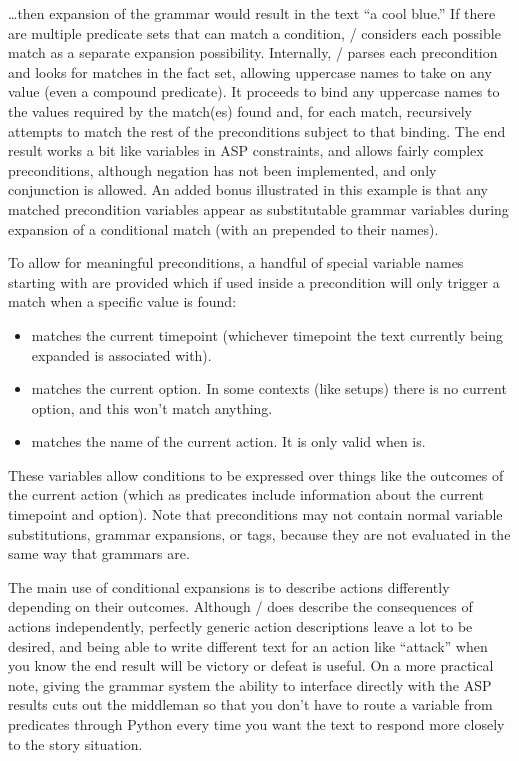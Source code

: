 \ldots then expansion of the grammar \prq{[[color]]}{} would result in the text ``a cool blue.''
%
If there are multiple predicate sets that can match a condition, \dunyazad/ considers each possible match as a separate expansion possibility.
%
Internally, \dunyazad/ parses each precondition and looks for matches in the fact set, allowing uppercase names to take on any value (even a compound predicate).
%
It proceeds to bind any uppercase names to the values required by the match(es) found and, for each match, recursively attempts to match the rest of the preconditions subject to that binding.
%
The end result works a bit like variables in ASP constraints, and allows fairly complex preconditions, although negation has not been implemented, and only conjunction is allowed.
%
An added bonus illustrated in this example is that any matched precondition variables appear as substitutable grammar variables during expansion of a conditional match (with an \exchar{\_} prepended to their names).


To allow for meaningful preconditions, a handful of special variable names starting with \exchar{\_} are provided which if used inside a precondition will only trigger a match when a specific value is found:
%
\begin{itemize}
  \item {} matches the current timepoint (whichever timepoint the text currently being expanded is associated with).
  \item {} matches the current option. In some contexts (like setups) there is no current option, and this won't match anything.
  \item {} matches the name of the current action. It is only valid when  is.
\end{itemize}
%
These variables allow conditions to be expressed over things like the outcomes of the current action (which as predicates include information about the current timepoint and option).
%
Note that preconditions may not contain normal variable substitutions, grammar expansions, or tags, because they are not evaluated in the same way that grammars are.


The main use of conditional expansions is to describe actions differently depending on their outcomes.
%
Although \dunyazad/ does describe the consequences of actions independently, perfectly generic action descriptions leave a lot to be desired, and being able to write different text for an action like ``attack'' when you know the end result will be victory or defeat is useful.
%
On a more practical note, giving the grammar system the ability to interface directly with the ASP results cuts out the middleman so that you don't have to route a variable from predicates through Python every time you want the text to respond more closely to the story situation.


